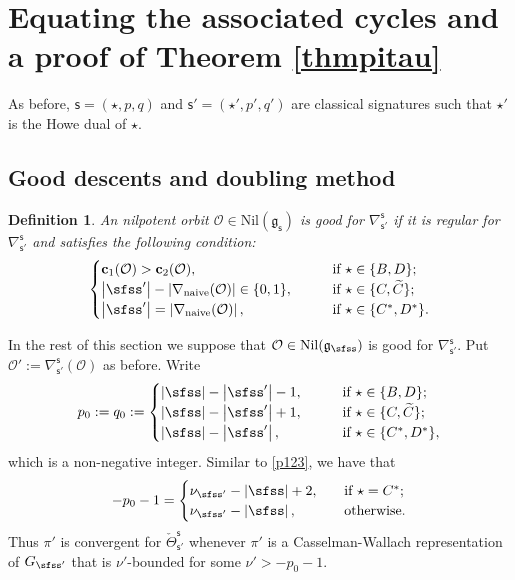 \documentclass[12pt,a4paper]{amsart}
\def\abs#1{\left|{#1}\right|}
\newcommand{\CO}{{\mathcal {O}}}
\newcommand{\g}{\mathfrak g}
\def\DD{\nabla}
\newcommand{\be}{\begin {equation}}
\newcommand{\ee}{\end {equation}}
\numberwithin{equation}{section}
\newtheorem{defn}[thm]{Definition}
\theoremstyle{remark}
\begin{document}
\section{Equating  the associated  cycles and a proof of Theorem \ref{thmpitau}}\label{sec:equac}



As before, $\mathsf s=(\star, p,q)$ and $ \mathsf s'=(\star', p',q')$ are classical signatures such that $\star'$ is the Howe dual of $\star$.


\subsection{Good descents and doubling method}


\begin{defn}
An nilpotent orbit $\CO\in \mathrm{Nil}(\g_\mathsf s)$ is good for $\DD_{\mathsf s'}^{\mathsf s}$ if it is regular for $\DD_{\mathsf s'}^{\mathsf s}$ and satisfies the following  condition:
\[
\begin{cases}
   \mathbf c_1(\CO)>\mathbf c_2(\CO), \qquad  &\textrm{if $\star \in\{B,D\}$}; \\
      \abs{\sfss'}-\abs{\DD_\mathrm{naive}(\CO)}\in\{0,1\},\qquad  &\textrm{if $\star \in\{C, \widetilde C\}$}; \\
\abs{\sfss'}=\abs{\DD_\mathrm{naive}(\CO)}, \qquad &\textrm{if $\star \in \{C^*, D^*\}$}.
  \end{cases}
\]


\end{defn}

In the rest of this section we suppose that $\CO\in \mathrm{Nil}(\g_\sfss)$ is good for $\DD_{\mathsf s'}^{\mathsf s}$. Put $\CO':=\DD_{\mathsf s'}^{\mathsf s}(\CO)$ as before. Write
 \[
  p_0:=q_0:=\begin{cases}
    \abs{\sfss}-\abs{\sfss'}-1, \qquad  &\textrm{if $\star \in\{B,D\}$}; \\
       \abs{\sfss}-\abs{\sfss'}+1, \qquad  &\textrm{if $\star \in\{C, \widetilde C\}$}; \\
 \abs{\sfss}-\abs{\sfss'},\qquad  &\textrm{if $\star \in \{C^*, D^*\}$},
  \end{cases}
\]
which is a non-negative integer.
Similar to \eqref{p123}, we have that 
\be\label{p1234}
-p_0-1=
  \begin{cases}
 \nu_{\sfss'}-\abs{\sfss} +2,\quad& \textrm{if $\star =C^*$};\\
  \nu_{\sfss'}-\abs{\sfss},\quad& \textrm{otherwise}.
   \end{cases}
   \ee
Thus    $\pi'$ is convergent for $\check \Theta_{\mathsf s'}^{\mathsf s}$ whenever $\pi'$ is a Casselman-Wallach representation of $G_{\sfss'}$  that is  $\nu'$-bounded for some
$
  \nu'>
 -p_0-1.
$
\end{document}
